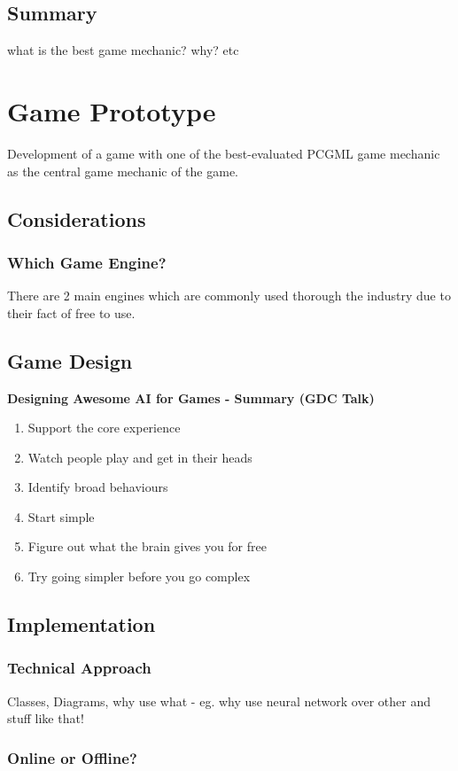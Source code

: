 \documentclass[MGS,Master,english]{twbook}%
\begin{document}
\section{Summary}
what is the best game mechanic? why? etc
%
%
\clearpage
\chapter{Game Prototype}
Development of a game with one of the best-evaluated PCGML game mechanic as the central game mechanic of the game.
\section{Considerations}

\subsection{Which Game Engine?}
There are 2 main engines which are commonly used thorough the industry due to their fact of free to use.

\section{Game Design}
\textbf{Designing Awesome AI for Games - Summary (GDC Talk)}
\begin{enumerate}
	\item Support the core experience
	\item Watch people play and get in their heads
	\item Identify broad behaviours
	\item Start simple
	\item Figure out what the brain gives you for free
	\item Try going simpler before you go complex
\end{enumerate}

\section{Implementation}
\subsection{Technical Approach}
Classes, Diagrams, why use what - eg. why use neural network over other and stuff like that!
\subsection{Online or Offline?}
\end{document}
